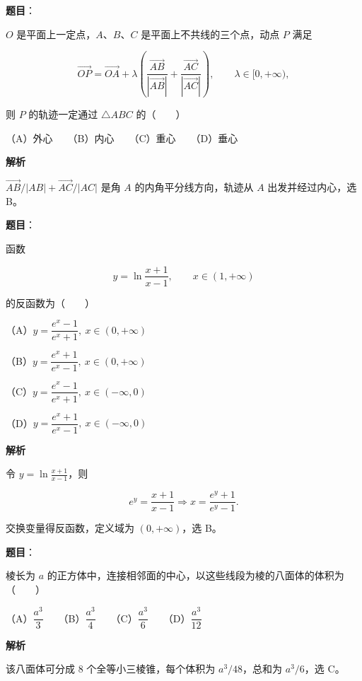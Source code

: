 \begin{answer}

\textbf{题目}：

$O$ 是平面上一定点，$A\text{、}B\text{、}C$ 是平面上不共线的三个点，动点 $P$ 满足

\nopagebreak[4]
\[
\overrightarrow{OP}
=\overrightarrow{OA}
+\lambda\left(
\frac{\overrightarrow{AB}}{|\overrightarrow{AB}|}
+\frac{\overrightarrow{AC}}{|\overrightarrow{AC}|}
\right),\qquad \lambda\in[0,+\infty),
\]

则 $P$ 的轨迹一定通过 $\triangle ABC$ 的\mbox{（　　）}

（A）外心　　（B）内心　　（C）重心　　（D）垂心

\textbf{解析}

$\overrightarrow{AB}/|AB|+\overrightarrow{AC}/|AC|$ 是角 $A$ 的内角平分线方向，轨迹从 $A$ 出发并经过内心，选 B。


\end{answer}
\begin{answer}

\textbf{题目}：

函数

\nopagebreak[4]
\[
y=\ln\frac{x+1}{x-1},\qquad x\in(1,+\infty)
\]

的反函数为\mbox{（　　）}

（A）$y=\dfrac{e^x-1}{e^x+1},\ x\in(0,+\infty)$

（B）$y=\dfrac{e^x+1}{e^x-1},\ x\in(0,+\infty)$

（C）$y=\dfrac{e^x-1}{e^x+1},\ x\in(-\infty,0)$

（D）$y=\dfrac{e^x+1}{e^x-1},\ x\in(-\infty,0)$

\textbf{解析}

令 $y=\ln\frac{x+1}{x-1}$，则

\nopagebreak[4]
\[
e^y=\frac{x+1}{x-1}
\Longrightarrow x=\frac{e^y+1}{e^y-1}.
\]

交换变量得反函数，定义域为 $(0,+\infty)$，选 B。


\end{answer}
\begin{answer}

\textbf{题目}：

棱长为 $a$ 的正方体中，连接相邻面的中心，以这些线段为棱的八面体的体积为\mbox{（　　）}

（A）$\dfrac{a^3}{3}$　　（B）$\dfrac{a^3}{4}$　　（C）$\dfrac{a^3}{6}$　　（D）$\dfrac{a^3}{12}$

\textbf{解析}

该八面体可分成 8 个全等小三棱锥，每个体积为 $a^3/48$，总和为 $a^3/6$，选 C。


\end{answer}
